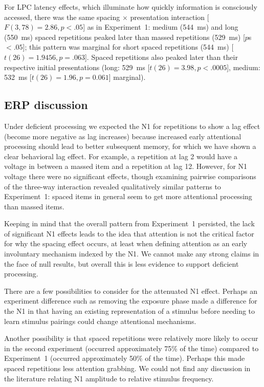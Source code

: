 For LPC latency effects, which illuminate how quickly information is consciously accessed, there was the same spacing $\times$ presentation interaction [$F(3,78)=2.86, p<.05$] as in Experiment~1: medium (544~ms) and long (550~ms) spaced repetitions peaked later than massed repetitions (529~ms) [$p$s~$<.05$]; this pattern was marginal for short spaced repetitions (544~ms) [$t(26)=1.9456, p=.063$].  Spaced repetitions also peaked later than their respective initial presentations (long: 529~ms [$t(26)=3.98, p<.0005$], medium: 532~ms [$t(26)=1.96, p=0.061$] marginal).

\subsection{ERP discussion}

Under deficient processing we expected the N1 for repetitions to show a lag effect (become more negative as lag increases) because increased early attentional processing should lead to better subsequent memory, for which we have shown a clear behavioral lag effect.  For example, a repetition at lag 2 would have a voltage in between a massed item and a repetition at lag 12.  However, for N1 voltage there were no significant effects, though examining pairwise comparisons of the three-way interaction revealed qualitatively similar patterns to Experiment~1:  spaced items in general seem to get more attentional processing than massed items.

Keeping in mind that the overall pattern from Experiment~1 persisted, the lack of significant N1 effects leads to the idea that attention is not the critical factor for why the spacing effect occurs, at least when defining attention as an early involuntary mechanism indexed by the N1.  We cannot make any strong claims in the face of null results, but overall this is less evidence to support deficient processing.

There are a few possibilities to consider for the attenuated N1 effect.
Perhaps an experiment difference such as removing the exposure phase made a difference for the N1 in that having an existing representation of a stimulus before needing to learn stimulus pairings could change attentional mechanisms.

Another possibility is that spaced repetitions were relatively more likely to occur in the second experiment (occurred approximately 75\% of the time) compared to Experiment~1 (occurred approximately 50\% of the time).  Perhaps this made spaced repetitions less attention grabbing.  We could not find any discussion in the literature relating N1 amplitude to relative stimulus frequency.

